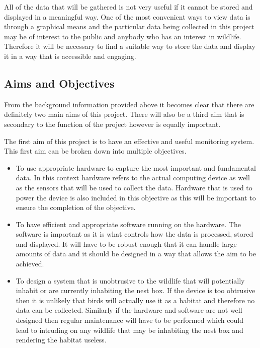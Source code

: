 \documentclass[10pt,a4paper]{article}
\begin{document}
All of the data that will be gathered is not very useful if it cannot be stored and displayed in a meaningful way. One of the most convenient ways to view data is through a graphical means and the particular data being collected in this project may be of interest to the public and anybody who has an interest in wildlife. Therefore it will be necessary to find a suitable way to store the data and display it in a way that is accessible and engaging. 

\subsection{Aims and Objectives}
From the background information provided above it becomes clear that there are definitely two main aims of this project. There will also be a third aim that is secondary to the function of the project however is equally important. 

The first aim of this project is to have an effective and useful monitoring system. This first aim can be broken down into multiple objectives. 
\begin{itemize}
\item To use appropriate hardware to capture the most important and fundamental data. In this context hardware refers to the actual computing device as well as the sensors that will be used to collect the data. Hardware that is used to power the device is also included in this objective as this will be important to ensure the completion of the objective.

\item To have efficient and appropriate software running on the hardware. The software is important as it is what controls how the data is processed, stored and displayed. It will have to be robust enough that it can handle large amounts of data and it should be designed in a way that allows the aim to be achieved. 

\item To design a system that is unobtrusive to the wildlife that will potentially inhabit or are currently inhabiting the nest box. If the device is too obtrusive then it is unlikely that birds will actually use it as a habitat and therefore no data can be collected. Similarly if the hardware and software are not well designed then regular maintenance will have to be performed which could lead to intruding on any wildlife that may be inhabiting the nest box and rendering the habitat useless. 
\end{itemize}
\end{document}
